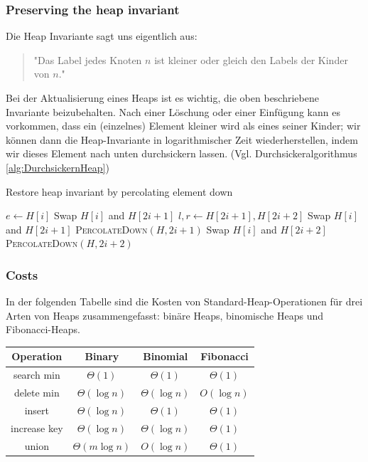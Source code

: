 \documentclass[a4paper]{article}
\begin{document}
\subsubsection*{Preserving the heap invariant}
Die Heap Invariante sagt uns eigentlich aus: 
\begin{quote}
    "Das Label jedes Knoten $n$ ist kleiner oder gleich den Labels der Kinder von $n$."
\end{quote}
Bei der Aktualisierung eines Heaps ist es wichtig, die oben beschriebene Invariante beizubehalten. Nach einer Löschung oder einer Einfügung kann es vorkommen, dass ein (einzelnes) Element kleiner wird als eines seiner Kinder; wir können dann die Heap-Invariante in logarithmischer Zeit wiederherstellen, indem wir dieses Element nach unten durchsickern lassen. (Vgl. Durchsickeralgorithmus \ref{alg:DurchsickernHeap})

\begin{algorithm}
\caption{Restore heap invariant by percolating element down} 
\label{alg:DurchsickernHeap}
\begin{algorithmic}[1] 
   
  \State $e \gets H\left[i\right]$
  \State Swap $H\left[i\right]$ and $H\left[2i+1\right]$
  \EndIf
  \State $l, r \gets H\left[2i+1\right], H\left[2i+2\right]$
  \State Swap $H\left[i\right]$ and $H\left[2i+1\right]$
  \State \textsc{PercolateDown}$\left(H, 2i+1\right)$
  \EndIf
  \Else
  \State Swap $H\left[i\right]$ and $H\left[2i+2\right]$
  \State \textsc{PercolateDown}$\left(H, 2i+2\right)$
  \EndIf
  \EndIf
  \EndIf  
  \EndFunction
\end{algorithmic}
\end{algorithm}

\subsubsection*{Costs}

In der folgenden Tabelle sind die Kosten von Standard-Heap-Operationen für drei Arten von Heaps zusammengefasst: binäre Heaps, binomische Heaps und Fibonacci-Heaps. \\

\begin{tabular}{|c|c|c|c|}
  \hline
  \label{Tab: KostenHeaps}
\textbf{Operation}    & \textbf{Binary}             & \textbf{Binomial}         & \textbf{Fibonacci}   \\
\hline
search min   & $\Theta(1)$        & $\Theta(1)$      & $\Theta(1)$ \\
delete min   & $\Theta(\log n)$   & $\Theta(\log n)$ & $O(\log n)$ \\
insert       & $\Theta(\log n)$   & $\Theta(1)$      & $\Theta(1)$ \\
increase key & $\Theta(\log n)$   & $\Theta(\log n)$ & $\Theta(1)$ \\
  union        & $\Theta(m \log n)$ & $O(\log n)$      & $\Theta(1)$  \\
                                                         \hline
\end{tabular}
\end{document}
